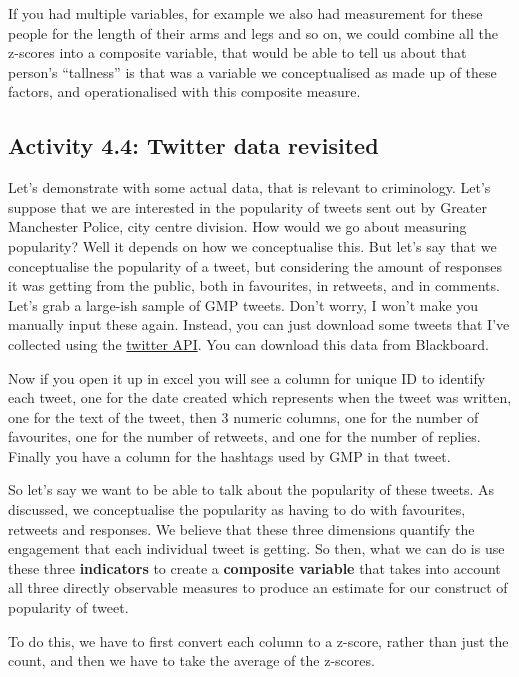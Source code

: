 \documentclass[
]{book}
\begin{document}
If you had multiple variables, for example we also had measurement for these people for the length of their arms and legs and so on, we could combine all the z-scores into a composite variable, that would be able to tell us about that person's ``tallness'' is that was a variable we conceptualised as made up of these factors, and operationalised with this composite measure.

\hypertarget{activity-4.4-twitter-data-revisited}{%
\subsection{Activity 4.4: Twitter data revisited}\label{activity-4.4-twitter-data-revisited}}

Let's demonstrate with some actual data, that is relevant to criminology. Let's suppose that we are interested in the popularity of tweets sent out by Greater Manchester Police, city centre division. How would we go about measuring popularity? Well it depends on how we conceptualise this. But let's say that we conceptualise the popularity of a tweet, but considering the amount of responses it was getting from the public, both in favourites, in retweets, and in comments. Let's grab a large-ish sample of GMP tweets. Don't worry, I won't make you manually input these again. Instead, you can just download some tweets that I've collected using the \href{https://developer.twitter.com/en/docs}{twitter API}. You can download this data from Blackboard.

Now if you open it up in excel you will see a column for unique ID to identify each tweet, one for the date created which represents when the tweet was written, one for the text of the tweet, then 3 numeric columns, one for the number of favourites, one for the number of retweets, and one for the number of replies. Finally you have a column for the hashtags used by GMP in that tweet.

So let's say we want to be able to talk about the popularity of these tweets. As discussed, we conceptualise the popularity as having to do with favourites, retweets and responses. We believe that these three dimensions quantify the engagement that each individual tweet is getting. So then, what we can do is use these three \textbf{indicators} to create a \textbf{composite variable} that takes into account all three directly observable measures to produce an estimate for our construct of popularity of tweet.

To do this, we have to first convert each column to a z-score, rather than just the count, and then we have to take the average of the z-scores.
\end{document}
